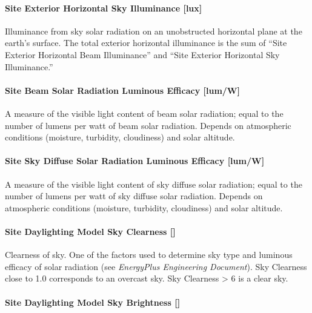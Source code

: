 \paragraph{Site Exterior Horizontal Sky Illuminance {[}lux{]}}\label{site-exterior-horizontal-sky-illuminance-lux}

Illuminance from sky solar radiation on an unobstructed horizontal plane at the earth's surface. The total exterior horizontal illuminance is the sum of ``Site Exterior Horizontal Beam Illuminance'' and ``Site Exterior Horizontal Sky Illuminance.''

\paragraph{Site Beam Solar Radiation Luminous Efficacy {[}lum/W{]}}\label{site-beam-solar-radiation-luminous-efficacy-lumw}

A measure of the visible light content of beam solar radiation; equal to the number of lumens per watt of beam solar radiation. Depends on atmospheric conditions (moisture, turbidity, cloudiness) and solar altitude.

\paragraph{Site Sky Diffuse Solar Radiation Luminous Efficacy {[}lum/W{]}}\label{site-sky-diffuse-solar-radiation-luminous-efficacy-lumw}

A measure of the visible light content of sky diffuse solar radiation; equal to the number of lumens per watt of sky diffuse solar radiation. Depends on atmospheric conditions (moisture, turbidity, cloudiness) and solar altitude.

\paragraph{Site Daylighting Model Sky Clearness {[]}}\label{site-daylighting-model-sky-clearness}

Clearness of sky. One of the factors used to determine sky type and luminous efficacy of solar radiation (see \emph{EnergyPlus Engineering Document}). Sky Clearness close to 1.0 corresponds to an overcast sky. Sky Clearness \textgreater{} 6 is a clear sky.

\paragraph{Site Daylighting Model Sky Brightness {[]}}\label{site-daylighting-model-sky-brightness}

